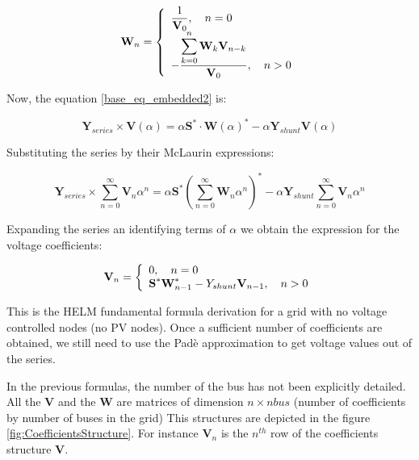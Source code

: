 \documentclass[11pt,fleqn]{book} %
\begin{document}
\begin{equation}
\textbf{W}_n =
\left\{
	\begin{array}{ll}
		\mathlarger{\frac{1}{\textbf{V}_0}}, \quad n=0\\
		\mathlarger{-\frac{\mathlarger{\sum_{k=0}^{n}\textbf{W}_k \textbf{V}_{n-k}}}{\textbf{V}_0}}, \quad n>0
	\end{array}
\right.
\end{equation}


Now, the equation \ref{base_eq_embedded2} is:

\begin{equation}
{\textbf{Y}_{series}\times \textbf{V}( \alpha )} = \alpha\textbf{S}^* \cdot \textbf{W}( \alpha)^*  - \alpha \textbf{Y}_{shunt} \textbf{V}( \alpha )
\label{base_eq_embedded3}
\end{equation}

Substituting the series by their McLaurin expressions:

\begin{equation}
{\textbf{Y}_{series}\times \sum_{n=0}^{\infty}{\textbf{V}_n \alpha^n}} = \alpha\textbf{S}^* \left(\sum_{n=0}^{\infty}{\textbf{W}_n \alpha^n}\right)^*  - \alpha \textbf{Y}_{shunt} \sum_{n=0}^{\infty}{\textbf{V}_n \alpha^n}
\label{base_eq_embedded4}
\end{equation}

Expanding the series an identifying terms of $\alpha$ we obtain the expression for the voltage coefficients:

\begin{equation}
\textbf{V}_n =
\left\{
	\begin{array}{ll}
		\mathlarger{0}, \quad n=0\\
		\mathlarger{\textbf{S}^* \textbf{W}^*_{n-1} - Y_{shunt} \textbf{V}_{n-1} }, \quad n>0
	\end{array}
\right.
\end{equation}

This is the HELM fundamental formula derivation for a grid with no voltage controlled nodes (no PV nodes). Once a sufficient number of coefficients are obtained, we still need to use the Padè approximation to get voltage values out of the series.


In the previous formulas, the number of the bus has not been explicitly detailed. All the $\textbf{V}$ and the $\textbf{W}$ are matrices of dimension $n \times nbus$ (number of coefficients by number of buses in the grid) This structures are depicted in the figure \ref{fig:CoefficientsStructure}. For instance $\textbf{V}_n$ is the $n^{th}$ row of the coefficients structure $\textbf{V}$.
\end{document}

